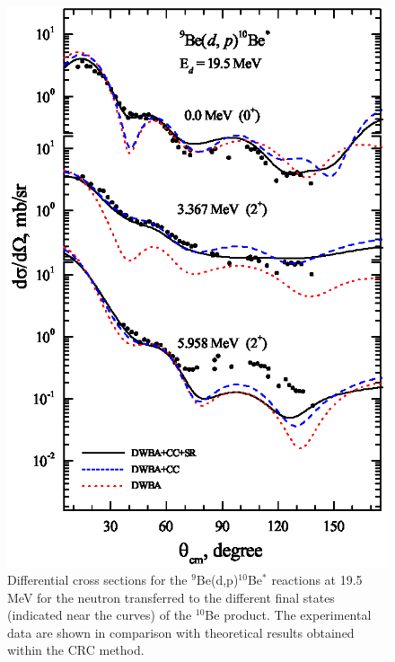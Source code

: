 \documentclass[10pt]{iopart}
\begin{document}
\begin{figure}[tp]
\includegraphics[scale=0.8]{1H10BE.eps}
\caption{\label{1H10BE} Differential cross sections for the ${}^9$Be(d,p)${}^{10}$Be$^*$ reactions at 19.5 MeV for the neutron transferred to the different final states (indicated near the curves) of the ${}^{10}$Be product. The experimental data are shown in comparison with theoretical results obtained within the CRC method.}
\end{figure}
\end{document}
